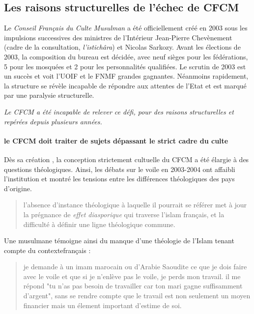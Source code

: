 \subsection*{Les raisons structurelles de l'échec de CFCM}
Le \textit{Conseil Français du Culte Musulman} a été officiellement créé  en 2003 sous les impulsions successives des ministres de l'Intérieur Jean-Pierre Chevènement (cadre de la consultation, \textit{l'istichâra}) et Nicolas Sarkozy. Avant les élections de 2003, la composition du bureau est décidée, avec neuf sièges pour les fédérations, 5 pour les mosquées et 2 pour les personnalités qualifiées. Le scrutin de 2003 est un succès et voit l'UOIF et le FNMF grandes gagnantes. Néanmoins rapidement, la structure se révèle incapable de répondre aux attentes de l'Etat et est marqué par une paralysie structurelle.


\textit{Le CFCM a été incapable de relever ce défi, pour des raisons structurelles et repérées depuis plusieurs années.}


\paragraph{le CFCM doit traiter de sujets dépassant le strict cadre du culte} Dès sa création , la conception strictement cultuelle du CFCM a été élargie à des questions théologiques. Ainsi, les débats sur le voile en 2003-2004 ont affaibli l'institution et montré les tensions entre les différences théologiques des pays d'origine.
\begin{quote}
    l'absence d'instance théologique à laquelle il pourrait se référer met à jour la prégnance de \textit{effet diasporique} qui traverse l'islam français, et la difficulté à définir une ligne théologique commune. 
\end{quote}
Une musulmane témoigne ainsi du manque d'une théologie de l'Islam tenant compte du contextefrançais  : 
\begin{quote}
    je demande à un imam marocain ou d'Arabie Saoudite ce que je dois faire avec le voile et que si je n'enlève pas le voile, je perds mon travail. il me répond "tu n'as pas besoin de travailler car ton mari gagne suffisamment d'argent", sans se rendre compte que le travail est non seulement un moyen financier mais un élement important d'estime de soi.
\end{quote}


